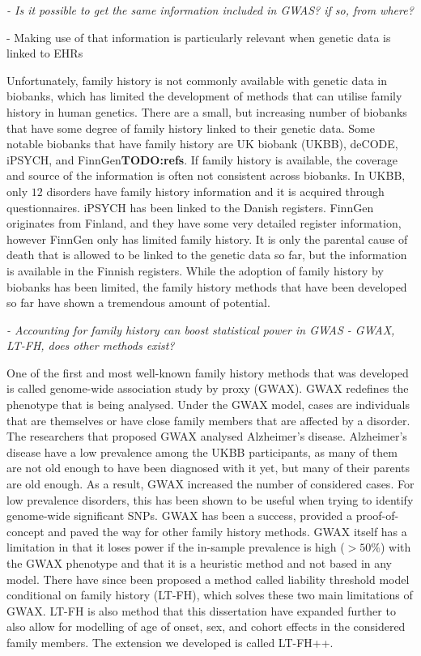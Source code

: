 {\itshape
- Is it possible to get the same information included in GWAS? if so, from where?

	- Making use of that information is particularly relevant when genetic data is linked to EHRs
}

Unfortunately, family history is not commonly available with genetic data in biobanks, which has limited the development of methods that can utilise family history in human genetics. There are a small, but increasing number of biobanks that have some degree of family history linked to their genetic data. Some notable biobanks that have family history are UK biobank (UKBB), deCODE, iPSYCH, and FinnGen\textbf{TODO:refs}. If family history is available, the coverage and source of the information is often not consistent across biobanks. In UKBB, only $ 12 $ disorders have family history information and it is acquired through questionnaires. iPSYCH has been linked to the Danish registers. FinnGen originates from Finland, and they have some very detailed register information, however FinnGen only has limited family history. It is only the parental cause of death that is allowed to be linked to the genetic data so far, but the information is available in the Finnish registers. While the adoption of family history by biobanks has been limited, the family history methods that have been developed so far have shown a tremendous amount of potential. 

{\itshape
	- Accounting for family history can boost statistical power in GWAS
	- GWAX, LT-FH, does other methods exist?
}

One of the first and most well-known family history methods that was developed is called genome-wide association study by proxy (GWAX). GWAX redefines the phenotype that is being analysed. Under the GWAX model, cases are individuals that are themselves or have close family members that are affected by a disorder. The researchers that proposed GWAX analysed Alzheimer's disease. Alzheimer's disease have a low prevalence among the UKBB participants, as many of them are not old enough to have been diagnosed with it yet, but many of their parents are old enough. As a result, GWAX increased the number of considered cases. For low prevalence disorders, this has been shown to be useful when trying to identify genome-wide significant SNPs. GWAX has been a success, provided a proof-of-concept and paved the way for other family history methods. GWAX itself has a limitation in that it loses power if the in-sample prevalence is high ($ >50\% $) with the GWAX phenotype and that it is a heuristic method and not based in any model. There have since been proposed a method called liability threshold model conditional on family history (LT-FH), which solves these two main limitations of GWAX. LT-FH is also method that this dissertation have expanded further to also allow for modelling of age of onset, sex, and cohort effects in the considered family members. The extension we developed is called LT-FH++.



